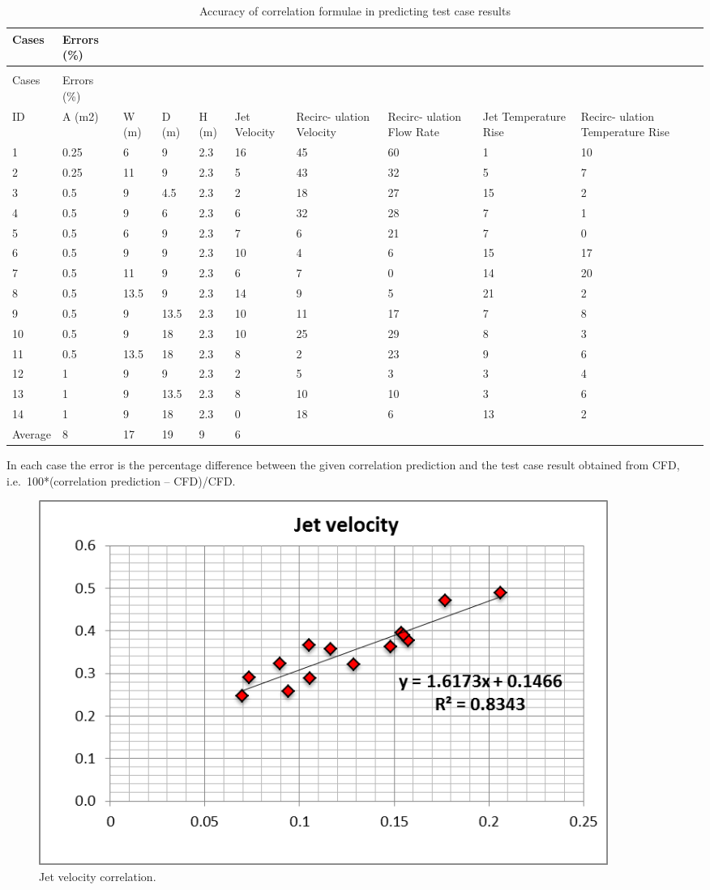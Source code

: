 {%
\begin{longtable}[c]{p{0.5in}p{0.4in}p{0.4in}p{0.4in}p{0.4in}p{0.4in}p{0.6in}p{0.6in}p{0.6in}p{0.6in}}
\caption{Accuracy of correlation formulae in predicting test case results \label{table:accuracy-of-correlation-formulae-in}} \tabularnewline
\toprule 
Cases & Errors (\%) \tabularnewline
\midrule
\endfirsthead

\caption[]{Accuracy of correlation formulae in predicting test case results} \tabularnewline
\toprule 
Cases & Errors (\%) \tabularnewline
\midrule
\endhead

ID & A (m2) & W (m) & D (m) & H (m) & Jet Velocity & Recirc- ulation Velocity & Recirc- ulation Flow Rate & Jet Temperature Rise & Recirc- ulation Temperature Rise \tabularnewline
1 & 0.25 & 6 & 9 & 2.3 & 16 & 45 & 60 & 1 & 10 \tabularnewline
2 & 0.25 & 11 & 9 & 2.3 & 5 & 43 & 32 & 5 & 7 \tabularnewline
3 & 0.5 & 9 & 4.5 & 2.3 & 2 & 18 & 27 & 15 & 2 \tabularnewline
4 & 0.5 & 9 & 6 & 2.3 & 6 & 32 & 28 & 7 & 1 \tabularnewline
5 & 0.5 & 6 & 9 & 2.3 & 7 & 6 & 21 & 7 & 0 \tabularnewline
6 & 0.5 & 9 & 9 & 2.3 & 10 & 4 & 6 & 15 & 17 \tabularnewline
7 & 0.5 & 11 & 9 & 2.3 & 6 & 7 & 0 & 14 & 20 \tabularnewline
8 & 0.5 & 13.5 & 9 & 2.3 & 14 & 9 & 5 & 21 & 2 \tabularnewline
9 & 0.5 & 9 & 13.5 & 2.3 & 10 & 11 & 17 & 7 & 8 \tabularnewline
10 & 0.5 & 9 & 18 & 2.3 & 10 & 25 & 29 & 8 & 3 \tabularnewline
11 & 0.5 & 13.5 & 18 & 2.3 & 8 & 2 & 23 & 9 & 6 \tabularnewline
12 & 1 & 9 & 9 & 2.3 & 2 & 5 & 3 & 3 & 4 \tabularnewline
13 & 1 & 9 & 13.5 & 2.3 & 8 & 10 & 10 & 3 & 6 \tabularnewline
14 & 1 & 9 & 18 & 2.3 & 0 & 18 & 6 & 13 & 2 \tabularnewline
Average & 8 & 17 & 19 & 9 & 6 \tabularnewline
\bottomrule
\end{longtable}

In each case the error is the percentage difference between the given correlation prediction and the test case result obtained from CFD, i.e.~100*\textbar{}(correlation prediction -- CFD)/CFD\textbar{}.

\begin{figure}[hbtp]
\centering
\includegraphics[width=0.9\textwidth, height=0.9\textheight, keepaspectratio=true]{media/image2652.png}
\caption{Jet velocity correlation. \protect \label{fig:jet-veolicty-correlation}}
\end{figure}

}
